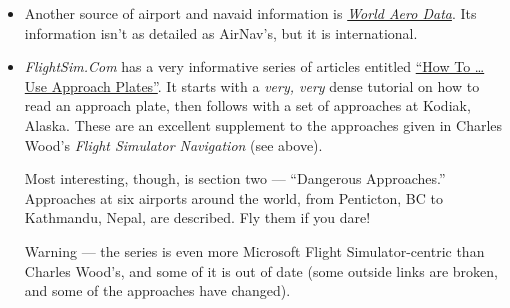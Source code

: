 \begin{itemize}
\item Another source of airport and navaid information is
  \href{http://worldaerodata.com}{\textit{World Aero Data}}.  Its
  information isn't as detailed as AirNav's, but it is international.

\item \textit{FlightSim.Com} has a very informative series of articles
  entitled
  \href{http://www.flightsim.com/main/howto/plate/linkpage.htm}{``How
    To \ldots{} Use Approach Plates''}.  It starts with a \emph{very,
    very} dense tutorial on how to read an approach plate, then
  follows with a set of approaches at Kodiak, Alaska.  These are an
  excellent supplement to the approaches given in Charles Wood's
  \textit{Flight Simulator Navigation} (see above).

  Most interesting, though, is section two --- ``Dangerous
  Approaches.''  Approaches at six airports around the world, from
  Penticton, BC to Kathmandu, Nepal, are described.  Fly them if you
  dare!

  Warning --- the series is even more Microsoft Flight
  Simulator-centric than Charles Wood's, and some of it is out of date
  (some outside links are broken, and some of the approaches have
  changed).

%
%

%
%

%
%

%
%

%
%

%
%


\end{itemize}
